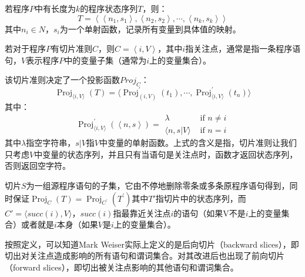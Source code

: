 \begin{definition}
    
    若程序$P$中有长度为$k$的程序状态序列$T$，则：
    $$T=\left\langle \left\langle n_{1},s_{1} \right\rangle, \left\langle n_{2},s_{2} \right\rangle , \cdots , \left\langle n_{k},s_{k} \right\rangle \right\rangle$$
    其中$n_{i} \in N$，$s_i$为一个单射函数，记录所有变量到具体值的映射。
\end{definition}

\begin{definition}
    
    若对于程序$P$有切片准则$C$，则$C=\left\langle i, V \right\rangle$，其中$i$指关注点，通常是指一条程序语句，$V$表示程序$P$中的变量子集（通常为$i$上的变量集合）。
    
\end{definition}

该切片准则决定了一个投影函数$Proj_C$：
$$
\operatorname{Proj}_{\langle i, V\rangle}(T)=\langle\operatorname{Proj}_{(i, V)}^{\prime}\left(t_{1}\right) , \cdots, \operatorname{Proj}_{\langle i, V\rangle}^{\prime}\left(t_{n}\right) \rangle
$$
其中：
$$
\operatorname{Proj}_{\langle i, V\rangle}^{\prime}(\left\langle n, s \right\rangle)=\begin{array}{ll}
{\lambda} & {\text { if } n \neq i} \\
{\langle n, s | V \rangle} & {\text { if } n=i}
\end{array}
$$
其中$\lambda$指空字符串，$s|V$指$V$中变量的单射函数。上式的含义是指，切片准则让我们只考虑$V$中变量的状态序列，并且只有当语句是关注点时，函数才返回状态序列，否则返回空字符。

\begin{definition}[程序切片]
    
    切片$S$为一组源程序语句的子集，它由不停地删除零条或多条原程序语句得到，同时保证$\operatorname{Proj}_{C}(T)=\operatorname{Proj}_{C^{\prime}}\left(T^{\prime}\right)$其中$T'$指切片中的状态序列，而$C'=\langle succ(i), V \rangle$，$succ(i)$指最靠近关注点$i$的语句（如果V不是$i$上的变量集合）或者就是$i$本身（如果$ V $是$i$上的变量集合）。
    
\end{definition}

按照定义，可以知道Mark Weiser实际上定义的是后向切片（backward slices），即切出对关注点造成影响的所有语句和谓词集合。对其改进后也出现了前向切片（forward slices），即切出被关注点影响的其他语句和谓词集合。\\

